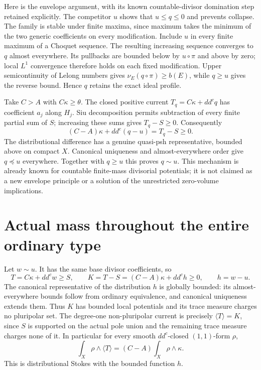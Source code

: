 \documentclass[11pt]{article}
\newcommand{\ddc}{dd^c}
\newcommand{\NP}[1]{\langle #1\rangle}
\theoremstyle{remark}\newtheorem{remark}[theorem]{Remark}
\begin{document}
Here is the envelope argument, with its known countable-divisor
domination step retained explicitly. The competitor $u$ shows that
$u\leq q\leq0$ and prevents collapse. The family is stable under
finite maxima, since maximum takes the minimum of the two generic
coefficients on every modification. Include $u$ in every finite
maximum of a Choquet sequence. The resulting increasing sequence
converges to $q$ almost everywhere. Its pullbacks are bounded below
by $u\circ\pi$ and above by zero; local $L^1$ convergence therefore
holds on each fixed modification. Upper semicontinuity of Lelong
numbers gives $\nu_E(q\circ\pi)\geq b(E)$, while $q\geq u$ gives
the reverse bound. Hence $q$ retains the exact ideal profile.

Take $C>A$ with $C\kappa\geq\theta$. The closed positive current
$T_q=C\kappa+\ddc q$ has coefficient $a_j$ along $H_j$.
Siu decomposition permits subtraction of every finite partial sum
of $S$; increasing these sums gives $T_q-S\geq0$. Consequently
\[
 (C-A)\kappa+\ddc(q-u)=T_q-S\geq0.
\]
The distributional difference has a genuine quasi-psh representative,
bounded above on compact $X$. Canonical uniqueness and almost-everywhere
order give $q\preceq u$ everywhere. Together with $q\geq u$ this
proves $q\sim u$. This mechanism is already known for countable
finite-mass divisorial potentials; it is not claimed as a new envelope
principle or a solution of the unrestricted zero-volume implications.

\section{Actual mass throughout the entire ordinary type}
Let $w\sim u$. It has the same base divisor coefficients, so
\[
 T=C\kappa+\ddc w\geq S,\qquad
 K=T-S=(C-A)\kappa+\ddc h\geq0,
 \qquad h=w-u.
\]
The canonical representative of the distribution $h$ is globally
bounded: its almost-everywhere bounds follow from ordinary equivalence,
and canonical uniqueness extends them. Thus $K$ has bounded local
potentials and its trace measure charges no pluripolar set. The
degree-one non-pluripolar current is precisely $\NP{T}=K$, since
$S$ is supported on the actual pole union and the remaining trace
measure charges none of it. In particular for every smooth
$\ddc$-closed $(1,1)$-form $\rho$,
\begin{equation}\label{eq:mixed}
 \int_X\rho\wedge\NP{T}=(C-A)\int_X\rho\wedge\kappa.
\end{equation}
This is distributional Stokes with the bounded function $h$.
\end{document}
